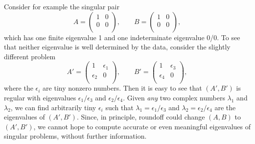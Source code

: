 Consider for example the singular pair
\[
A  = \left( \begin{array}{cc}
                          1 & 0 \\ 0 & 0 \\
            \end{array} \right), \quad\quad
B  = \left( \begin{array}{cc}
                         1 & 0 \\ 0 & 0 \\
            \end{array} \right),
\]
which has one finite eigenvalue 1 and one indeterminate eigenvalue 0/0.
To see that neither eigenvalue is well determined by the data,
consider the slightly different problem
\[
A'  = \left( \begin{array}{cc}
                          1 & \epsilon_1 \\ \epsilon_2 & 0 \\
            \end{array} \right), \quad\quad
B'  = \left( \begin{array}{cc}
                         1 & \epsilon_3 \\ \epsilon_4 & 0 \\
            \end{array} \right),
\]
where the $\epsilon_i$ are tiny nonzero numbers. Then it is easy to see
that $(A',B')$ is regular with eigenvalues
$\epsilon_1 / \epsilon_3$ and
$\epsilon_2 / \epsilon_4$. Given {\em any} two complex numbers $\lambda_1$ and
$\lambda_2$, we can find arbitrarily tiny $\epsilon_i$ such that
$\lambda_1 = \epsilon_1 / \epsilon_3$ and
$\lambda_2 = \epsilon_2 / \epsilon_4$ are the eigenvalues of $(A',B')$.
Since, in principle, roundoff could change $(A,B)$ to $(A',B')$, we
cannot hope to compute accurate or even meaningful eigenvalues of
singular problems, without further information.



